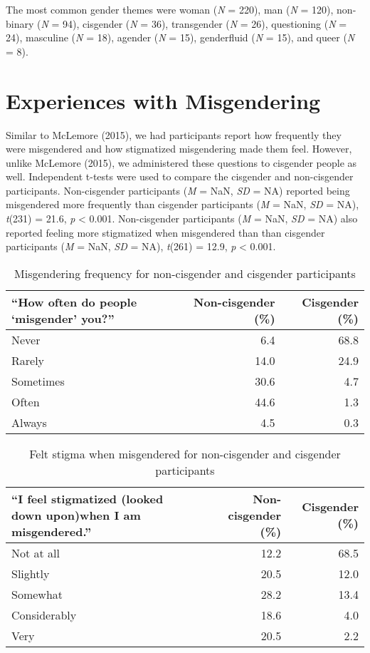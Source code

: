 \documentclass[12pt,twoside]{reedthesis}
\begin{document}
The most common gender themes were woman (\emph{N} = 220), man (\emph{N} = 120), non-binary (\emph{N} = 94), cisgender (\emph{N} = 36), transgender (\emph{N} = 26), questioning (\emph{N} = 24), masculine (\emph{N} = 18), agender (\emph{N} = 15), genderfluid (\emph{N} = 15), and queer (\emph{N} = 8).

\hypertarget{experiences-with-misgendering}{%
\section{Experiences with Misgendering}\label{experiences-with-misgendering}}

Similar to McLemore (2015), we had participants report how frequently they were misgendered and how stigmatized misgendering made them feel. However, unlike McLemore (2015), we administered these questions to cisgender people as well. Independent t-tests were used to compare the cisgender and non-cisgender participants. Non-cisgender participants (\emph{M} = NaN, \emph{SD} = NA) reported being misgendered more frequently than cisgender participants (\emph{M} = NaN, \emph{SD} = NA), \emph{t}(231) = 21.6, \emph{p} \textless{} 0.001.
Non-cisgender participants (\emph{M} = NaN, \emph{SD} = NA) also reported feeling more stigmatized when misgendered than than cisgender participants (\emph{M} = NaN, \emph{SD} = NA), \emph{t}(261) = 12.9, \emph{p} \textless{} 0.001.
\begin{table}

\caption{\label{tab:unnamed-chunk-1}Misgendering frequency for non-cisgender and cisgender participants}
\centering
\begin{tabular}[t]{l|r|r}
\hline
“How often do people ‘misgender’ you?” & Non-cisgender (\%) & Cisgender (\%)\\
\hline
Never & 6.4 & 68.8\\
\hline
Rarely & 14.0 & 24.9\\
\hline
Sometimes & 30.6 & 4.7\\
\hline
Often & 44.6 & 1.3\\
\hline
Always & 4.5 & 0.3\\
\hline
\end{tabular}
\end{table}
\begin{table}

\caption{\label{tab:unnamed-chunk-2}Felt stigma when misgendered for non-cisgender and cisgender participants}
\centering
\begin{tabular}[t]{l|r|r}
\hline
“I feel stigmatized (looked down upon)when I am misgendered.” & Non-cisgender (\%) & Cisgender (\%)\\
\hline
Not at all & 12.2 & 68.5\\
\hline
Slightly & 20.5 & 12.0\\
\hline
Somewhat & 28.2 & 13.4\\
\hline
Considerably & 18.6 & 4.0\\
\hline
Very & 20.5 & 2.2\\
\hline
\end{tabular}
\end{table}
\end{document}
